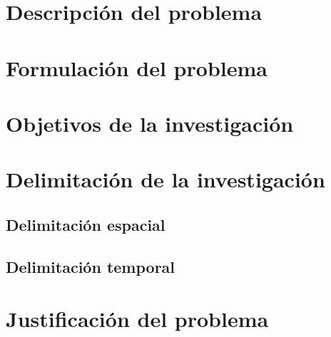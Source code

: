 
\section{Descripción del problema}

\section{Formulación del problema}


\section{Objetivos de la investigación}


\section{Delimitación de la investigación}
\subsection{Delimitación espacial}
\DelimEspacial

\subsection{Delimitación temporal}
\DelimTemporal

\section{Justificación del problema}
